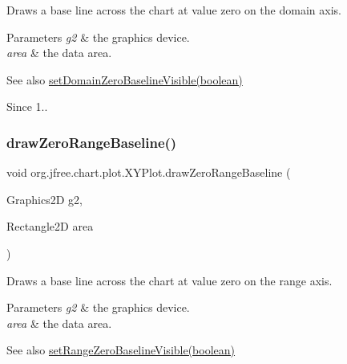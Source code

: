 Draws a base line across the chart at value zero on the domain axis.


\begin{DoxyParams}{Parameters}
{\em g2} & the graphics device. \\
\hline
{\em area} & the data area.\\
\hline
\end{DoxyParams}
\begin{DoxySeeAlso}{See also}
\mbox{\hyperlink{classorg_1_1jfree_1_1chart_1_1plot_1_1_x_y_plot_ac7550f7b8a62959de2654cfe50970e36}{set\+Domain\+Zero\+Baseline\+Visible(boolean)}}
\end{DoxySeeAlso}
\begin{DoxySince}{Since}
1.. 
\end{DoxySince}
\mbox{\label{classorg_1_1jfree_1_1chart_1_1plot_1_1_x_y_plot_a2b728d76cd5efb93b68bb1ae878b23c9}} 
\subsubsection{\texorpdfstring{draw\+Zero\+Range\+Baseline()}{drawZeroRangeBaseline()}}
{\footnotesize\ttfamily void org.\+jfree.\+chart.\+plot.\+X\+Y\+Plot.\+draw\+Zero\+Range\+Baseline (\begin{DoxyParamCaption}\item[{Graphics2D}]{g2,  }\item[{Rectangle2D}]{area }\end{DoxyParamCaption})\hspace{0.3cm}{\ttfamily [protected]}}

Draws a base line across the chart at value zero on the range axis.


\begin{DoxyParams}{Parameters}
{\em g2} & the graphics device. \\
\hline
{\em area} & the data area.\\
\hline
\end{DoxyParams}
\begin{DoxySeeAlso}{See also}
\mbox{\hyperlink{classorg_1_1jfree_1_1chart_1_1plot_1_1_x_y_plot_a51560b2df5cce8d8565595c9f74981bb}{set\+Range\+Zero\+Baseline\+Visible(boolean)}} 
\end{DoxySeeAlso}
\mbox{\label{classorg_1_1jfree_1_1chart_1_1plot_1_1_x_y_plot_a1e3d4ae560ec96a7a33ac2c1044bda3d}} 
